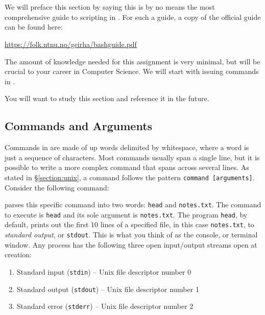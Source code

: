 \section{\Bash{}}\label{section:bash}

We will preface this section by saying this is by no means the most
comprehensive guide to scripting in \Bash{}. For such a guide, a copy of the official \Bash{} guide can be found here:

\vspace\baselineskip
\centerline{\url{https://folk.ntnu.no/geirha/bashguide.pdf}}
\vspace\baselineskip

The amount of \Bash{} knowledge needed for this assignment is very minimal, but
will be crucial to your career in Computer Science. We will start with issuing
commands in \Bash{}. \begin{bfseries}
  \color{red} You will want to study this section and reference it in the future.
\end{bfseries}

\subsection{Commands and Arguments}

Commands in \Bash{} are made of up words delimited by whitespace, where a word is
just a sequence of characters. Most commands usually span a single line, but it
is possible to write a more complex command that spans across several lines. As
stated in \S\ref{section:unix}, a command follows the pattern \texttt{command
[arguments]}. Consider the following command:


\Bash{} parses this specific command into two words: \texttt{head} and
\texttt{notes.txt}. The command to execute is \texttt{head} and its sole
argument is \texttt{notes.txt}. The program \texttt{head}, by default, prints
out the first $10$ lines of a specified file, in this case \texttt{notes.txt},
to \emph{standard output}, or \texttt{stdout}. This is what you think of as the
console, or terminal window. Any \Unix{} process has the following three open
input/output streams open at creation:

\begin{enumerate}
  \item Standard input (\texttt{stdin}) -- Unix file descriptor number 0
  \item Standard output (\texttt{stdout}) -- Unix file descriptor number 1
  \item Standard error (\texttt{stderr}) -- Unix file descriptor number 2
\end{enumerate}

